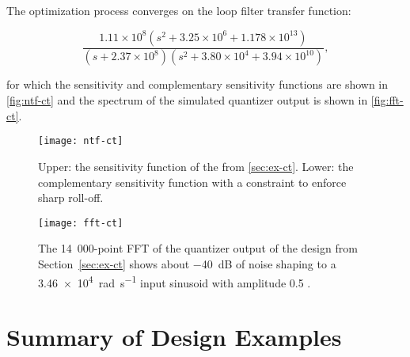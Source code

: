 The optimization process converges on the loop filter transfer function:

\begin{equation*}
	\frac{1.11\times10^8\left(s^2 + 3.25\times10^6 + 1.178\times10^{13}\right)}{\left(s + 2.37\times10^8\right)\left(s^2 + 3.80\times10^4 + 3.94\times10^{10}\right)},
\end{equation*}

for which the sensitivity and complementary sensitivity functions are shown in \autoref{fig:ntf-ct} and the spectrum of the simulated quantizer output is shown in \autoref{fig:fft-ct}.

\begin{figure}
	\centering
	\texttt{[image: ntf-ct]}
	\caption{Upper: the sensitivity function of the  from \autoref{sec:ex-ct}. Lower: the complementary sensitivity function with a  constraint to enforce sharp roll-off.} \label{fig:ntf-ct}
\end{figure}

\begin{figure}
	\centering
	\texttt{[image: fft-ct]}
	\caption{The 14~000-point FFT of the quantizer output of the  design from Section~\ref{sec:ex-ct} shows about \SI{-40}{\deci\bel} of noise shaping to a \SI{3.46e4}{\radian\per\second} input sinusoid with amplitude 0.5 .} \label{fig:fft-ct}
\end{figure}

\section{Summary of Design Examples}
\label{sec:ex-compare}

